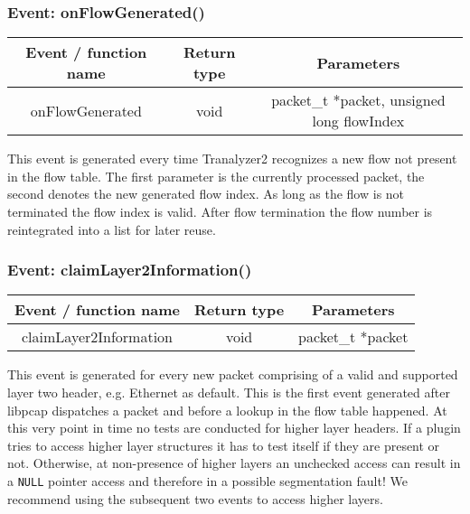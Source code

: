 \documentclass[documentation]{subfiles}
\begin{document}
\subsubsection{Event: onFlowGenerated()}
\begin{longtable}{ccc}
    \toprule
    {\bf Event / function name} & {\bf Return type} & {\bf Parameters} \\
    \midrule\endhead%
    onFlowGenerated & void & packet\_t *packet, unsigned long flowIndex \\
    \bottomrule
\end{longtable}
This event is generated every time Tranalyzer2 recognizes a new flow not present in the flow table. The first parameter is the currently processed packet, the second denotes the new generated flow index. As long as the flow is not terminated the flow index is valid. After flow termination the flow number is reintegrated into a list for later reuse.

\subsubsection{Event: claimLayer2Information()}
\begin{longtable}{ccc}
    \toprule
    {\bf Event / function name} & {\bf Return type} & {\bf Parameters} \\
    \midrule\endhead%
    claimLayer2Information & void & packet\_t *packet \\
    \bottomrule
\end{longtable}
This event is generated for every new packet comprising of a valid and supported layer two header, e.g. Ethernet as default. This is the first event generated after libpcap dispatches a packet and before a lookup in the flow table happened. At this very point in time no tests are conducted for higher layer headers. If a plugin tries to access higher layer structures it has to test itself if they are present or not. Otherwise, at non-presence of higher layers an unchecked access can result in a {\tt NULL} pointer access and therefore in a possible segmentation fault! We recommend using the subsequent two events to access higher layers.
\end{document}
